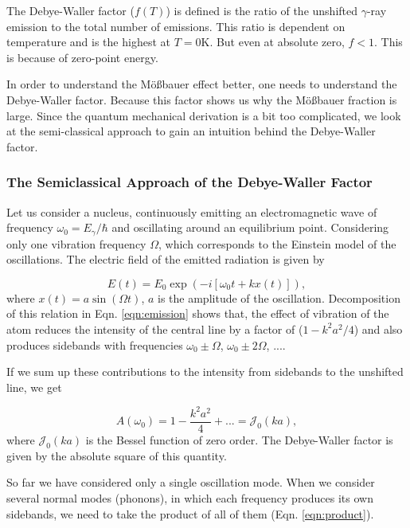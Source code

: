 \documentclass[a4paper]{report}
\numberwithin{equation}{section}
\begin{document}
The Debye-Waller factor ($f(T)$) is defined is the ratio of the unshifted $\gamma$-ray emission to the total number of emissions. This ratio is dependent on temperature and is the highest at $T = 0 \si{\kelvin}$. But even at absolute zero, $f < 1$. This is because of zero-point energy. 

In order to understand the M\"o{\ss}bauer effect better, one needs to understand the Debye-Waller factor. Because this factor shows us why the M\"o{\ss}bauer fraction is large. Since the quantum mechanical derivation is a bit too complicated, we look at the semi-classical approach to gain an intuition behind the Debye-Waller factor.

\subsubsection{The Semiclassical Approach of the Debye-Waller Factor}
Let us consider a nucleus, continuously emitting an electromagnetic wave of frequency $\omega_{0} = E_{\gamma}/\hbar $ and oscillating around an equilibrium point. Considering only one vibration frequency $\Omega$, which corresponds to the Einstein model of the oscillations. The electric field of the emitted radiation is given by

\begin{equation} \label{eqn:emission}
		E(t) = E_{0} \exp\left(- i [\omega_{0} t + k x(t) ] \right),
\end{equation}
where $x(t) = a \sin (\Omega t)$, $a$ is the amplitude of the oscillation. Decomposition of this relation in Eqn. \ref{eqn:emission} shows that, the effect of vibration of the atom reduces the intensity of the central line by a factor of ($1 - k^2 a^2 / 4$) and also produces sidebands with frequencies $\omega_{0} \pm \Omega$, $\omega_{0} \pm 2 \Omega$, .... 

If we sum up these contributions to the intensity from sidebands to the unshifted line, we get

\begin{equation}
		A(\omega_{0}) = 1 - \frac{k^2 a^2}{4} + ... = \mathcal{J}_{0} (ka),
\end{equation}
where $\mathcal{J}_{0} (ka)$ is the Bessel function of zero order. The Debye-Waller factor is given by the absolute square of this quantity. 

So far we have considered only a single oscillation mode. When we consider several normal modes (phonons), in which each frequency produces its own sidebands, we need to take the product of all of them (Eqn. \ref{eqn:product}). 
\end{document}
